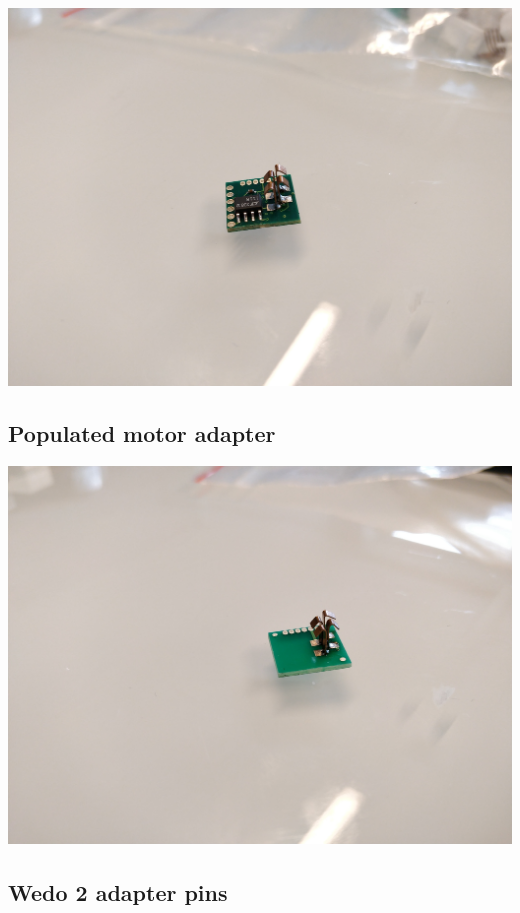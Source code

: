 \documentclass[a4paper,12pt]{article}
\begin{document}
\includegraphics[width=13.5cm]{sensor-populated-circuit.jpg}

\subsection{Populated motor adapter}

\includegraphics[width=13.5cm]{motor-populated-circuit.jpg}

\subsection{Wedo 2 adapter pins}
\end{document}
